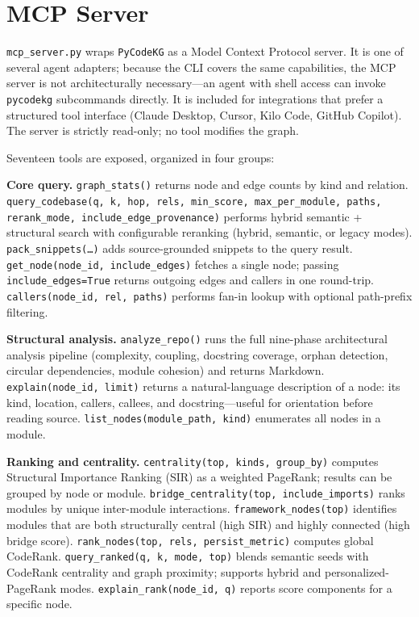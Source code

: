 \documentclass[10pt]{article}
\begin{document}
\section{MCP Server}

\texttt{mcp\_server.py} wraps \texttt{PyCodeKG} as a Model Context Protocol server.
It is one of several agent adapters; because the CLI covers the same capabilities,
the MCP server is not architecturally necessary---an agent with shell access can
invoke \texttt{pycodekg} subcommands directly.  It is included for integrations that
prefer a structured tool interface (Claude Desktop, Cursor, Kilo Code, GitHub
Copilot).  The server is strictly read-only; no tool modifies the graph.

Seventeen tools are exposed, organized in four groups:

\textbf{Core query.}
\texttt{graph\_stats()} returns node and edge counts by kind and relation.
\texttt{query\_codebase(q, k, hop, rels, min\_score, max\_per\_module, paths,
rerank\_mode, include\_edge\_provenance)} performs hybrid semantic + structural search
with configurable reranking (hybrid, semantic, or legacy modes).
\texttt{pack\_snippets(\ldots)} adds source-grounded snippets to the query result.
\texttt{get\_node(node\_id, include\_edges)} fetches a single node; passing
\texttt{include\_edges=True} returns outgoing edges and callers in one round-trip.
\texttt{callers(node\_id, rel, paths)} performs fan-in lookup with optional
path-prefix filtering.

\textbf{Structural analysis.}
\texttt{analyze\_repo()} runs the full nine-phase architectural analysis pipeline
(complexity, coupling, docstring coverage, orphan detection, circular dependencies,
module cohesion) and returns Markdown.
\texttt{explain(node\_id, limit)} returns a natural-language description of a
node: its kind, location, callers, callees, and docstring---useful for orientation
before reading source.
\texttt{list\_nodes(module\_path, kind)} enumerates all nodes in a module.

\textbf{Ranking and centrality.}
\texttt{centrality(top, kinds, group\_by)} computes Structural Importance Ranking
(SIR) as a weighted PageRank; results can be grouped by node or module.
\texttt{bridge\_centrality(top, include\_imports)} ranks modules by unique
inter-module interactions.
\texttt{framework\_nodes(top)} identifies modules that are both structurally
central (high SIR) and highly connected (high bridge score).
\texttt{rank\_nodes(top, rels, persist\_metric)} computes global CodeRank.
\texttt{query\_ranked(q, k, mode, top)} blends semantic seeds with CodeRank
centrality and graph proximity; supports hybrid and personalized-PageRank modes.
\texttt{explain\_rank(node\_id, q)} reports score components for a specific node.
\end{document}
